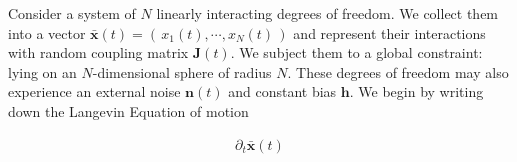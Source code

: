 Consider a system of $N$ linearly interacting degrees of freedom. We collect them into a vector $\mathbf{\bar x}(t) = \left(\,x_1(t),\cdots, x_N(t)\,\right)$ and represent their interactions with random coupling matrix $\mathbf{J}(t)$. We subject them to a global constraint: lying on an $N$-dimensional sphere of radius $N$. These degrees of freedom may also experience an external noise $\mathbf{n}(t)$ and constant bias $\mathbf{h}$. We begin by writing down the Langevin Equation of motion

\begin{align}
\partial_t\mathbf{\bar x}(t)
\end{align}